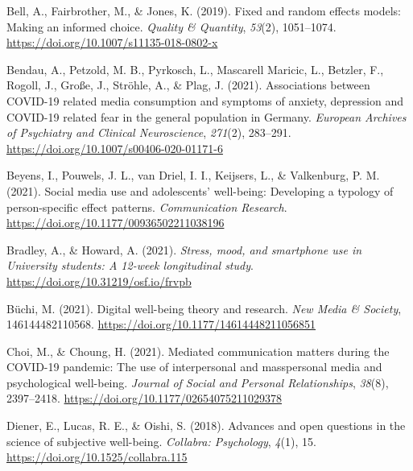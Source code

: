 \documentclass[
  man,mask,floatsintext]{apa7}
\newlength{\cslhangindent}
\newlength{\cslentryspacingunit} %
\newenvironment{CSLReferences}[2] %
 {%
  \setlength{\parindent}{0pt}
  \ifodd #1
  \let\oldpar\par
  \def\par{\hangindent=\cslhangindent\oldpar}
  \fi
  \setlength{\parskip}{#2\cslentryspacingunit}
 }%
 {}
\begin{document}
\hypertarget{refs}{}
\begin{CSLReferences}{1}{0}
\leavevmode{}%
Bell, A., Fairbrother, M., \& Jones, K. (2019). Fixed and random effects models: Making an informed choice. \emph{Quality \& Quantity}, \emph{53}(2), 1051--1074. \url{https://doi.org/10.1007/s11135-018-0802-x}

\leavevmode{}%
Bendau, A., Petzold, M. B., Pyrkosch, L., Mascarell Maricic, L., Betzler, F., Rogoll, J., Große, J., Ströhle, A., \& Plag, J. (2021). Associations between {COVID-19} related media consumption and symptoms of anxiety, depression and {COVID-19} related fear in the general population in {Germany}. \emph{European Archives of Psychiatry and Clinical Neuroscience}, \emph{271}(2), 283--291. \url{https://doi.org/10.1007/s00406-020-01171-6}

\leavevmode{}%
Beyens, I., Pouwels, J. L., van Driel, I. I., Keijsers, L., \& Valkenburg, P. M. (2021). Social media use and adolescents' well-being: {Developing} a typology of person-specific effect patterns. \emph{Communication Research}. \url{https://doi.org/10.1177/00936502211038196}

\leavevmode{}%
Bradley, A., \& Howard, A. (2021). \emph{Stress, mood, and smartphone use in {University} students: {A} 12-week longitudinal study}. \url{https://doi.org/10.31219/osf.io/frvpb}

\leavevmode{}%
Büchi, M. (2021). Digital well-being theory and research. \emph{New Media \& Society}, 146144482110568. \url{https://doi.org/10.1177/14614448211056851}

\leavevmode{}%
Choi, M., \& Choung, H. (2021). Mediated communication matters during the {COVID-19} pandemic: {The} use of interpersonal and masspersonal media and psychological well-being. \emph{Journal of Social and Personal Relationships}, \emph{38}(8), 2397--2418. \url{https://doi.org/10.1177/02654075211029378}

\leavevmode{}%
Diener, E., Lucas, R. E., \& Oishi, S. (2018). Advances and open questions in the science of subjective well-being. \emph{Collabra: Psychology}, \emph{4}(1), 15. \url{https://doi.org/10.1525/collabra.115}


\end{CSLReferences}
\end{document}
